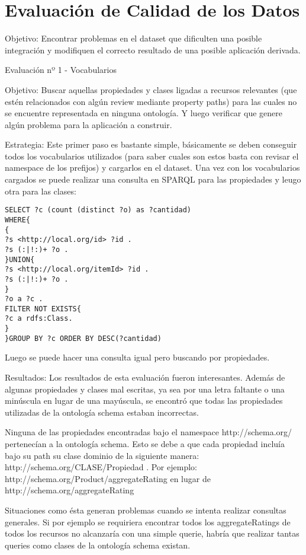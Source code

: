 \chapter{Evaluación de Calidad de los Datos}
\label{chapter:evaluacion}

Objetivo:
Encontrar problemas en el dataset que dificulten una posible integración y modifiquen el correcto resultado de una posible aplicación derivada.

Evaluación nº 1 - Vocabularios

Objetivo:
Buscar aquellas propiedades y clases ligadas a recursos relevantes (que estén relacionados con algún review mediante property paths) 
para las cuales no se encuentre representada en ninguna ontología. Y luego verificar que genere algún problema para la aplicación a construir.

Estrategia:
Este primer paso es bastante simple, básicamente se deben conseguir todos los vocabularios utilizados (para saber cuales son estos basta con revisar el namespace 
de los prefijos) y cargarlos en el dataset.
Una vez con los vocabularios cargados se puede realizar una consulta en SPARQL para las propiedades y leugo otra para las clases:

\begin{lstlisting}[frame=single]
SELECT ?c (count (distinct ?o) as ?cantidad)
WHERE{
{
?s <http://local.org/id> ?id .
?s (:|!:)+ ?o .
}UNION{
?s <http://local.org/itemId> ?id .
?s (:|!:)+ ?o .
}
?o a ?c .
FILTER NOT EXISTS{
?c a rdfs:Class.
}
}GROUP BY ?c ORDER BY DESC(?cantidad)
\end{lstlisting}

Luego se puede hacer una consulta igual pero buscando por propiedades.

Resultados:
Los resultados de esta evaluación fueron interesantes. Además de algunas propiedades y clases mal escritas, ya sea por una letra faltante o una minúscula en lugar 
de una mayúscula, se encontró que todas las propiedades utilizadas de la ontología schema estaban incorrectas.

Ninguna de las propiedades encontradas bajo el namespace http://schema.org/ pertenecían a la ontología schema.
Esto se debe a que cada propiedad incluía bajo su path su clase dominio de la siguiente manera: http://schema.org/CLASE/Propiedad .
Por ejemplo:
http://schema.org/Product/aggregateRating en lugar de http://schema.org/aggregateRating

Situaciones como ésta generan problemas cuando se intenta realizar consultas generales. Si por ejemplo se requiriera encontrar todos los aggregateRatings de todos los recursos no alcanzaría con 
una simple querie, habría que realizar tantas queries como clases de la ontología schema existan.

